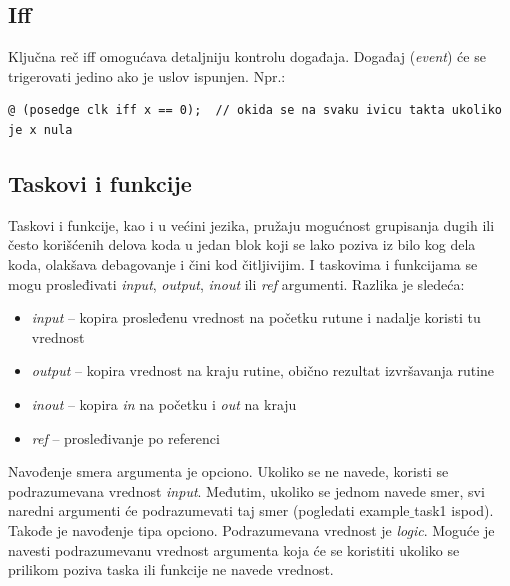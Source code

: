 
\subsection{Iff}

Ključna reč iff omogućava detaljniju kontrolu događaja.
Događaj (\emph{event}) će se trigerovati jedino ako je uslov ispunjen.
Npr.:
\begin{lstlisting}
@ (posedge clk iff x == 0);  // okida se na svaku ivicu takta ukoliko je x nula
\end{lstlisting}


\subsection{Taskovi i funkcije}

Taskovi i funkcije, kao i u većini jezika, pružaju mogućnost grupisanja dugih
ili često korišćenih delova koda u jedan blok koji se lako poziva iz bilo kog
dela koda, olakšava debagovanje i čini kod čitljivijim.
I taskovima i funkcijama se mogu prosleđivati \emph{input}, \emph{output},
\emph{inout} ili \emph{ref} argumenti.
Razlika je sledeća:

\begin{itemize}
\item \emph{input} –
  kopira prosleđenu vrednost na početku rutune i nadalje koristi tu vrednost
\item \emph{output} –
  kopira vrednost na kraju rutine, obično rezultat izvršavanja rutine
\item \emph{inout} – kopira \emph{in} na početku i \emph{out} na kraju
\item \emph{ref} – prosleđivanje po referenci
\end{itemize}

Navođenje smera argumenta je opciono.
Ukoliko se ne navede, koristi se podrazumevana vrednost \emph{input}.
Međutim, ukoliko se jednom navede smer, svi naredni argumenti će podrazumevati
taj smer (pogledati example\(\_\)task1 ispod).
Takođe je navođenje tipa opciono.
Podrazumevana vrednost je \emph{logic}.
Moguće je navesti podrazumevanu vrednost argumenta koja će se koristiti ukoliko
se prilikom poziva taska ili funkcije ne navede vrednost.\\

